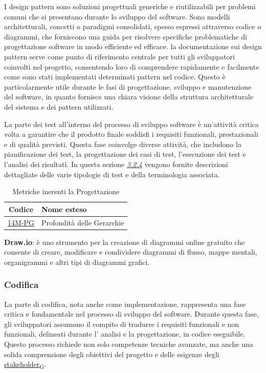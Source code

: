 I design pattern  sono soluzioni progettuali generiche e riutilizzabili per problemi comuni che si presentano durante lo sviluppo del software. Sono modelli architetturali, concetti o paradigmi consolidati, spesso espressi attraverso codice o diagrammi, che forniscono una guida per risolvere specifiche problematiche di progettazione software in modo efficiente ed efficace. la documentazione sui design pattern serve come punto di riferimento centrale per tutti gli sviluppatori coinvolti nel progetto, consentendo loro di comprendere rapidamente e facilmente come sono stati implementati determinati pattern nel codice. Questo è particolarmente utile durante le fasi di progettazione, sviluppo e manutenzione del software, in quanto fornisce una chiara visione della struttura architetturale del sistema e dei pattern utilizzati.

La parte dei test all'interno del processo di sviluppo software è un'attività critica volta a garantire che il prodotto finale soddisfi i requisiti funzionali, prestazionali e di qualità previsti. Questa fase coinvolge diverse attività, che includono la pianificazione dei test, la progettazione dei casi di test, l'esecuzione dei test e l'analisi dei risultati. In questa sezione \hyperref[testing]{\textit{3.2.4}} vengono fornite descrizioni dettagliate delle varie tipologie di test e della terminologia associata.

\begin{table}[!h]
	\centering
	\begin{tabular}{ | c | l | }
		\hline
		\textbf{Codice}                     & \textbf{Nome esteso}       \\
		\hline
		\underline{\hyperlink{14M}{14M-PG}} & Profondità delle Gerarchie \\
		\hline
	\end{tabular}
	\caption{Metriche inerenti la Progettazione}
\end{table}

\textbf{Draw.io}: è uno strumento per la creazione di diagrammi online gratuito che consente di creare, modificare e condividere diagrammi di flusso, mappe mentali, organigrammi e altri tipi di diagrammi grafici.

\subsubsection{Codifica}
La parte di codifica, nota anche come implementazione, rappresenta una fase critica e fondamentale nel processo di sviluppo del software. Durante questa fase, gli sviluppatori assumono il compito di tradurre i requisiti funzionali e non funzionali, delineati durante l' analisi e la progettazione, in codice eseguibile. Questo processo richiede non solo competenze tecniche avanzate, ma anche una solida comprensione degli obiettivi del progetto e delle esigenze degli \href{https://7last.github.io/docs/rtb/documentazione-interna/glossario\#stakeholder}{stakeholder\textsubscript{G}}.

